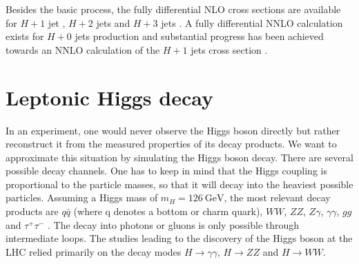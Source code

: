 Besides the basic process, the fully differential NLO cross sections are available for $H + 1$ jet \cite{gghj_nlo_fullydiff_1,gghj_nlo_fullydiff_2}, $H + 2$ jets \cite{gghjj_nlo_fullydiff_1,gghjj_nlo_fullydiff_2} and $H + 3$ jets \cite{gghjjj_nlo_fullydiff}.
A fully differential NNLO calculation exists for $H + 0$ jets production \cite{ggh_nnlo_fullydiff_1,ggh_nnlo_fullydiff_2} and substantial progress has been achieved towards an NNLO calculation of the $H + 1$ jets cross section \cite{gghj_nnlo_progress}.
%
\section{Leptonic Higgs decay}
In an experiment, one would never observe the Higgs boson directly but rather reconstruct it from the measured properties of its decay products.
We want to approximate this situation by simulating the Higgs boson decay.
There are several possible decay channels.
One has to keep in mind that the Higgs coupling is proportional to the particle masses, so that it will decay into the heaviest possible particles.
Assuming a Higgs mass of $m_H = \SI{126}{\giga\electronvolt}$, the most relevant decay products are $q \bar q$ (where q denotes a bottom or charm quark), $WW$, $ZZ$, $Z \gamma$, $\gamma \gamma$, $gg$ and $\tau^+ \tau^-$ \cite{higgshandbook2}.
The decay into photons or gluons is only possible through intermediate loops.
The studies leading to the discovery of the Higgs boson at the LHC relied primarily on the decay modes $H \rightarrow \gamma \gamma$, $H \rightarrow ZZ$ and $H \rightarrow WW$.

